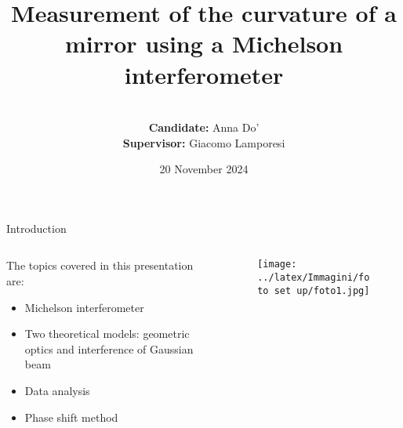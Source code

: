 \documentclass[handout]{beamer}
\title{Measurement of the curvature of a mirror using a Michelson interferometer}
\author{\\\textbf{Candidate:} Anna Do'\\ \textbf{Supervisor:} Giacomo Lamporesi }
\date{20 November 2024}
\institute{\\~\\Bachelor's Degree in Physics}
\theoremstyle{plain}
\theoremstyle{remark}
\theoremstyle{definition}
\begin{document}
	\begin{frame}[plain]
	    \maketitle
	\end{frame}



\begin{frame}{Introduction}
\begin{columns}[T]
\begin{column}{0.5\textwidth}
  


  The topics covered in this presentation are:
  \begin{itemize}
    \item Michelson interferometer
    \item Two theoretical models: geometric optics and interference of Gaussian beam
    \item Data analysis
    \item Phase shift method
  \end{itemize}
\end{column}
\begin{column}{0.5\textwidth}
\begin{figure}[h!]
  \centering
  \texttt{[image: ../latex/Immagini/foto set up/foto1.jpg]}
\end{figure}
\end{column}
\end{columns}

\end{frame}
\end{document}
